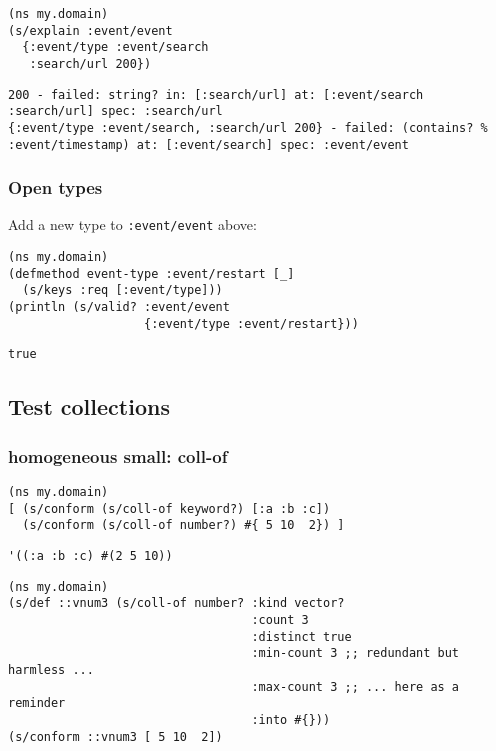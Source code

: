 \documentclass[10pt,oneside,x11names]{article}
\begin{document}
\begin{verbatim}
(ns my.domain)
(s/explain :event/event
  {:event/type :event/search
   :search/url 200})
\end{verbatim}

\begin{verbatim}
200 - failed: string? in: [:search/url] at: [:event/search :search/url] spec: :search/url
{:event/type :event/search, :search/url 200} - failed: (contains? % :event/timestamp) at: [:event/search] spec: :event/event
\end{verbatim}

\subsubsection{Open types}
\label{sec:org763212f}

Add a new type to \texttt{:event/event} above:

\begin{verbatim}
(ns my.domain)
(defmethod event-type :event/restart [_]
  (s/keys :req [:event/type]))
(println (s/valid? :event/event
                   {:event/type :event/restart}))
\end{verbatim}

\begin{verbatim}
true
\end{verbatim}

\subsection{Test collections}
\label{sec:orgfd102b8}

\subsubsection{homogeneous small: coll-of}
\label{sec:orgde884c8}

\begin{verbatim}
(ns my.domain)
[ (s/conform (s/coll-of keyword?) [:a :b :c])
  (s/conform (s/coll-of number?) #{ 5 10  2}) ]
\end{verbatim}

\begin{verbatim}
'((:a :b :c) #(2 5 10))
\end{verbatim}


\begin{verbatim}
(ns my.domain)
(s/def ::vnum3 (s/coll-of number? :kind vector?
                                  :count 3
                                  :distinct true
                                  :min-count 3 ;; redundant but harmless ...
                                  :max-count 3 ;; ... here as a reminder
                                  :into #{}))
(s/conform ::vnum3 [ 5 10  2])
\end{verbatim}
\end{document}
